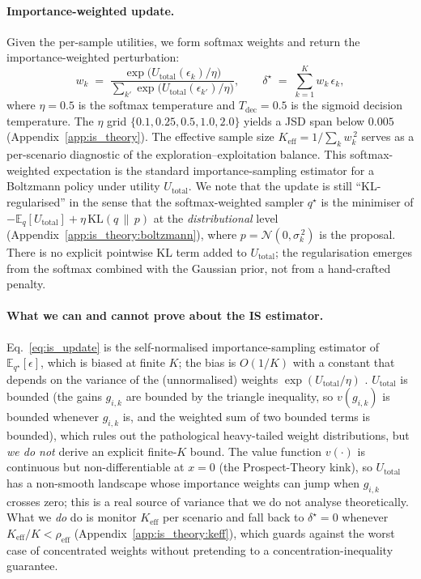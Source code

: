 \documentclass{article}
\begin{document}
\paragraph{Importance-weighted update.}
Given the per-sample utilities, we form softmax weights and return the
importance-weighted perturbation:
\begin{equation}
  w_k \;=\; \frac{\exp\!\bigl(U_{\text{total}}(\epsilon_k)/\eta\bigr)}
                 {\sum_{k'}\exp\!\bigl(U_{\text{total}}(\epsilon_{k'})/\eta\bigr)},
  \qquad
  \delta^{\star} \;=\; \sum_{k=1}^{K} w_k\,\epsilon_k,
  \label{eq:is_update}
\end{equation}
where $\eta = 0.5$ is the softmax temperature and $T_{\text{dec}} = 0.5$ is the
sigmoid decision temperature. The $\eta$ grid
$\{0.1,0.25,0.5,1.0,2.0\}$ yields a JSD span below $0.005$
(Appendix~\ref{app:is_theory}). The effective sample size
$K_{\text{eff}} = 1/\sum_k w_k^{\,2}$ serves as a per-scenario diagnostic of
the exploration--exploitation balance.
This softmax-weighted expectation is the standard importance-sampling estimator
for a Boltzmann policy under utility $U_{\text{total}}$.
We note that the update is still ``KL-regularised'' in the sense that the
softmax-weighted sampler $q^{\star}$ is the minimiser of
$-\mathbb{E}_{q}[U_{\text{total}}]+\eta\,\mathrm{KL}(q\,\|\,p)$ at the
\emph{distributional} level (Appendix~\ref{app:is_theory:boltzmann}), where
$p=\mathcal{N}(0,\sigma_k^{\,2})$ is the proposal. There is no explicit
pointwise KL term added to $U_{\text{total}}$; the regularisation emerges
from the softmax combined with the Gaussian prior, not from a hand-crafted
penalty.

\paragraph{What we can and cannot prove about the IS estimator.}
Eq.~\ref{eq:is_update} is the self-normalised importance-sampling estimator
of $\mathbb{E}_{q^{\star}}[\epsilon]$, which is biased at finite $K$; the
bias is $O(1/K)$ with a constant that depends on the variance of the
(unnormalised) weights $\exp(U_{\text{total}}/\eta)$
\citep{agapiou2017importance}. $U_{\text{total}}$ is bounded (the gains
$g_{i,k}$ are bounded by the triangle inequality, so $v(g_{i,k})$ is bounded
whenever $g_{i,k}$ is, and the weighted sum of two bounded terms is
bounded), which rules out the pathological heavy-tailed weight
distributions, but \emph{we do not} derive an explicit finite-$K$ bound.
The value function $v(\cdot)$ is continuous but non-differentiable at
$x{=}0$ (the Prospect-Theory kink), so $U_{\text{total}}$ has a
non-smooth landscape whose importance weights can jump when $g_{i,k}$
crosses zero; this is a real source of variance that we do not analyse
theoretically. What we \emph{do} do is monitor $K_{\text{eff}}$ per scenario
and fall back to $\delta^{\star}=0$ whenever $K_{\text{eff}}/K<\rho_{\text{eff}}$
(Appendix~\ref{app:is_theory:keff}), which guards against the worst case of
concentrated weights without pretending to a concentration-inequality
guarantee.
\end{document}
